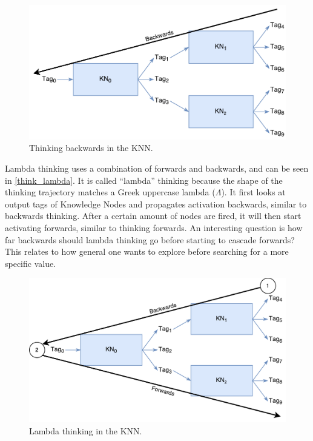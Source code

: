 \documentclass[titlepage,11pt]{article}
\begin{document}
\begin{figure}[!htb]
	\includegraphics[width=\columnwidth]{figures/backwards_thinking.pdf}
	\caption{Thinking backwards in the KNN.}
	\label{think_backwards}
\end{figure}

Lambda thinking uses a combination of forwards and backwards, and can be seen in \autoref{think_lambda}. It is called ``lambda'' thinking because the shape of the thinking trajectory matches a Greek uppercase lambda ($\Lambda$). It first looks at output tags of Knowledge Nodes and propagates activation backwards, similar to backwards thinking. After a certain amount of nodes are fired, it will then start activating forwards, similar to thinking forwards. An interesting question is how far backwards should lambda thinking go before starting to cascade forwards? This relates to how general one wants to explore before searching for a more specific value.

\begin{figure}[!htb]
\includegraphics[width=\columnwidth]{figures/lambda_thinking.pdf}
\caption{Lambda thinking in the KNN.}
\label{think_lambda}
\end{figure}
\end{document}
